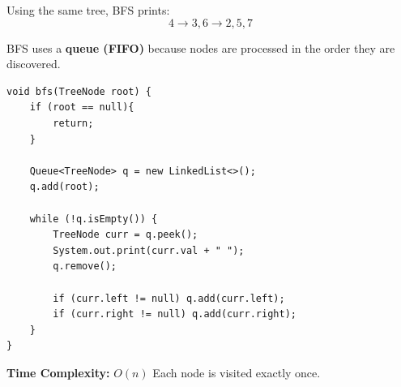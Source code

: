 Using the same tree, BFS prints:
\[
4 \rightarrow 3,6 \rightarrow 2,5,7
\]

BFS uses a \textbf{queue (FIFO)} because nodes are processed in the order they are discovered.

\begin{verbatim}
void bfs(TreeNode root) {
    if (root == null){
        return;
    }

    Queue<TreeNode> q = new LinkedList<>();
    q.add(root);

    while (!q.isEmpty()) {
        TreeNode curr = q.peek();
        System.out.print(curr.val + " ");
        q.remove();

        if (curr.left != null) q.add(curr.left);
        if (curr.right != null) q.add(curr.right);
    }
}
\end{verbatim}

\textbf{Time Complexity:} $O(n)$  
Each node is visited exactly once.